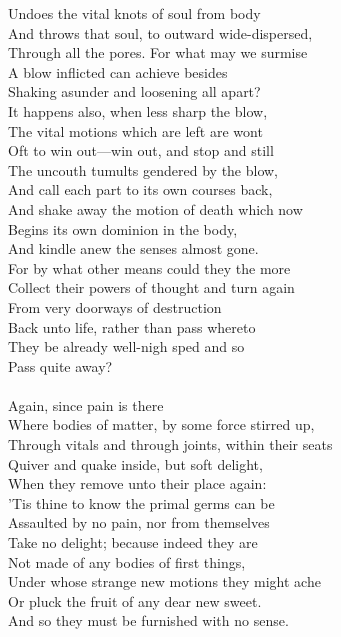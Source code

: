 Undoes the vital knots of soul from body\\
And throws that soul, to outward wide-dispersed,\\
Through all the pores. For what may we surmise\\
A blow inflicted can achieve besides\\
Shaking asunder and loosening all apart?\\
It happens also, when less sharp the blow,\\
The vital motions which are left are wont\\
Oft to win out—win out, and stop and still\\
The uncouth tumults gendered by the blow,\\
And call each part to its own courses back,\\
And shake away the motion of death which now\\
Begins its own dominion in the body,\\
And kindle anew the senses almost gone.\\
For by what other means could they the more\\
Collect their powers of thought and turn again\\
From very doorways of destruction\\
Back unto life, rather than pass whereto\\
They be already well-nigh sped and so\\
Pass quite away?\\
\\
Again, since pain is there\\
Where bodies of matter, by some force stirred up,\\
Through vitals and through joints, within their seats\\
Quiver and quake inside, but soft delight,\\
When they remove unto their place again:\\
'Tis thine to know the primal germs can be\\
Assaulted by no pain, nor from themselves\\
Take no delight; because indeed they are\\
Not made of any bodies of first things,\\
Under whose strange new motions they might ache\\
Or pluck the fruit of any dear new sweet.\\
And so they must be furnished with no sense.\\
